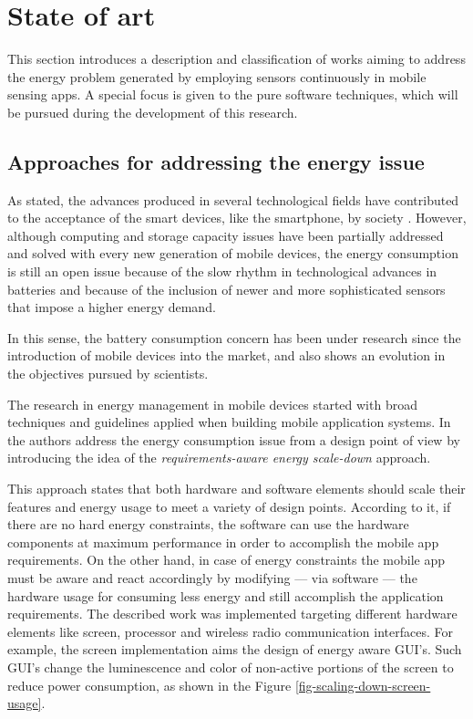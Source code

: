 \section{State of art} 
\label{sec:state_of_art}
This section introduces a description and classification of works aiming to address the energy problem generated by employing sensors continuously in mobile sensing apps.
A special focus is given to the pure software techniques, which will be pursued during the development of this research.

\subsection{Approaches for addressing the energy issue}
\label{sub:approaches_for_addressing_the_energy_issue}

As stated, the advances produced in several technological fields have contributed to the acceptance of the smart devices, like the smartphone, by society \cite{Lane2010,Ra2012}.
However, although computing and storage capacity issues have been partially addressed and solved with every new generation of mobile devices, the energy consumption is still an open issue because of the slow rhythm in technological advances in batteries and because of the inclusion of newer and more sophisticated sensors that impose a higher energy demand.

In this sense, the battery consumption concern has been under research since the introduction of mobile devices into the market, and also shows an evolution in the objectives pursued by scientists. 

The research in energy management in mobile devices started with broad techniques and guidelines applied when building mobile application systems.
In \cite{Mayo2003} the authors address the energy consumption issue from a design point of view by introducing the idea of the \emph{requirements-aware energy scale-down} approach. 

This approach states that both hardware and software elements should scale their features and energy usage to meet a variety of design points.
According to it, if there are no hard energy constraints, the software can use the hardware components at maximum performance in order to accomplish the mobile app requirements.
On the other hand, in case of energy constraints the mobile app must be aware and react accordingly by modifying --- via software --- the hardware usage for consuming less energy and still accomplish the application requirements.
The described work was implemented targeting different hardware elements like screen, processor and wireless radio communication interfaces.
For example, the screen implementation aims the design of energy aware GUI's.
Such GUI's change the luminescence and color of non-active portions of the screen to reduce power consumption, as shown in the Figure \ref{fig-scaling-down-screen-usage}.

